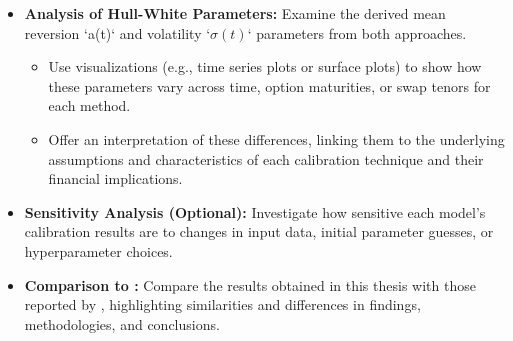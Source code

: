 \begin{itemize}
	\item \textbf{Analysis of Hull-White Parameters:} Examine the derived mean reversion `a(t)` and volatility `$\sigma(t)$` parameters from both approaches.
	      \begin{itemize}
		      \item Use visualizations (e.g., time series plots or surface plots) to show how these parameters vary across time, option maturities, or swap tenors for each method.
		      \item Offer an interpretation of these differences, linking them to the underlying assumptions and characteristics of each calibration technique and their financial implications.
	      \end{itemize}
	\item \textbf{Sensitivity Analysis (Optional):} Investigate how sensitive each model's calibration results are to changes in input data, initial parameter guesses, or hyperparameter choices.
	\item \textbf{Comparison to \textcite{hernandez2016model}:} Compare the results obtained in this thesis with those reported by \textcite{hernandez2016model}, highlighting similarities and differences in findings, methodologies, and conclusions.
\end{itemize}
